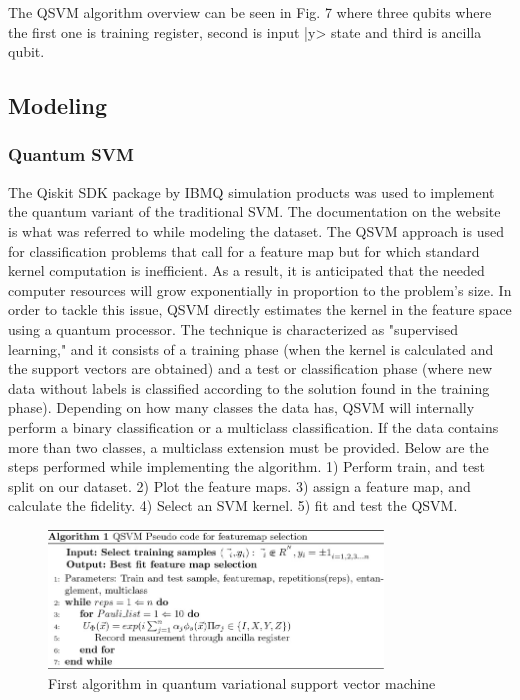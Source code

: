 \documentclass[10pt,journal,compsoc]{IEEEtran}
\begin{document}
\quad The QSVM algorithm overview can be seen in Fig. 7 where three qubits where the first one is training register, second is input |y> state and third is ancilla qubit. 

\subsection{Modeling}
\subsubsection{Quantum SVM}
The Qiskit SDK package by IBMQ simulation products was used to implement the quantum variant of the traditional SVM. The documentation on the website is what was referred to while modeling the dataset. The QSVM approach is used for classification problems that call for a feature map but for which standard kernel computation is inefficient. As a result, it is anticipated that the needed computer resources will grow exponentially in proportion to the problem's size. In order to tackle this issue, QSVM directly estimates the kernel in the feature space using a quantum processor. The technique is characterized as "supervised learning," and it consists of a training phase (when the kernel is calculated and the support vectors are obtained) and a test or classification phase (where new data without labels is classified according to the solution found in the training phase). Depending on how many classes the data has, QSVM will internally perform a binary classification or a multiclass classification. If the data contains more than two classes, a multiclass extension must be provided. Below are the steps performed while implementing the algorithm. 1) Perform train, and test split on our dataset. 2) Plot the feature maps. 3) assign a feature map, and calculate the fidelity. 4) Select an SVM kernel. 5) fit and test the QSVM. 

\begin{figure}[h]
\centering
\includegraphics[width=3.5in]{code1.jpeg}
\caption{First algorithm in quantum variational support vector machine}
\end{figure}
\end{document}
